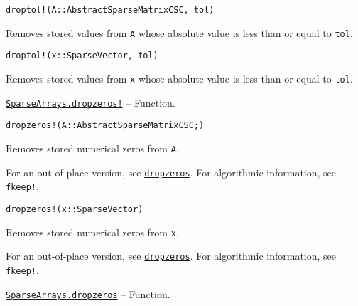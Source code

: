 \begin{adjustwidth}{2em}{0pt}


\begin{verbatim}
droptol!(A::AbstractSparseMatrixCSC, tol)
\end{verbatim}

Removes stored values from \texttt{A} whose absolute value is less than or equal to \texttt{tol}.




\begin{lstlisting}
droptol!(x::SparseVector, tol)
\end{lstlisting}

Removes stored values from \texttt{x} whose absolute value is less than or equal to \texttt{tol}.



\end{adjustwidth}
\hypertarget{13132808383029320263}{}
\hyperlink{13132808383029320263}{\texttt{SparseArrays.dropzeros!}}  -- {Function.}

\begin{adjustwidth}{2em}{0pt}


\begin{verbatim}
dropzeros!(A::AbstractSparseMatrixCSC;)
\end{verbatim}

Removes stored numerical zeros from \texttt{A}.

For an out-of-place version, see \hyperlink{10222793754853330762}{\texttt{dropzeros}}. For algorithmic information, see \texttt{fkeep!}.




\begin{lstlisting}
dropzeros!(x::SparseVector)
\end{lstlisting}

Removes stored numerical zeros from \texttt{x}.

For an out-of-place version, see \hyperlink{10222793754853330762}{\texttt{dropzeros}}. For algorithmic information, see \texttt{fkeep!}.



\end{adjustwidth}
\hypertarget{10222793754853330762}{}
\hyperlink{10222793754853330762}{\texttt{SparseArrays.dropzeros}}  -- {Function.}

